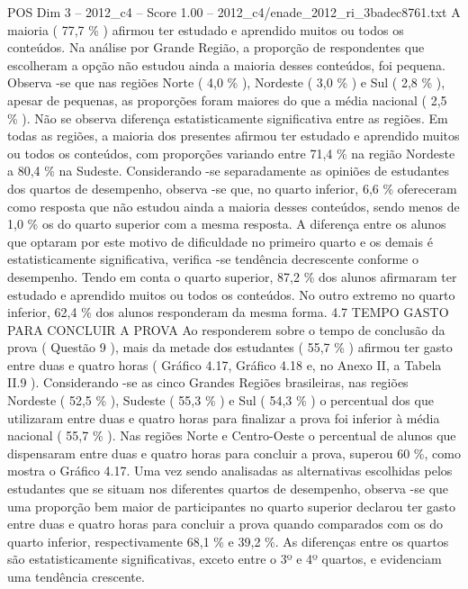 \begin{textsample}{POS Dim 3 – 2012\_c4 – Score 1.00 – 2012\_c4/enade\_2012\_ri\_3badec8761.txt}
A maioria ( 77,7 \% ) afirmou ter estudado e aprendido muitos ou todos os conteúdos.
Na análise por Grande Região, a proporção de respondentes que escolheram a opção não estudou ainda a maioria desses conteúdos, foi pequena.
Observa -se que nas regiões Norte ( 4,0 \% ), Nordeste ( 3,0 \% ) e Sul ( 2,8 \% ), apesar de pequenas, as proporções foram maiores do que a média nacional ( 2,5 \% ).
Não se observa diferença estatisticamente significativa entre as regiões.
Em todas as regiões, a maioria dos presentes afirmou ter estudado e aprendido muitos ou todos os conteúdos, com proporções variando entre 71,4 \% na região Nordeste a 80,4 \% na Sudeste.
Considerando -se separadamente as opiniões de estudantes dos quartos de desempenho, observa -se que, no quarto inferior, 6,6 \% ofereceram como resposta que não estudou ainda a maioria desses conteúdos, sendo menos de 1,0 \% os do quarto superior com a mesma resposta.
A diferença entre os alunos que optaram por este motivo de dificuldade no primeiro quarto e os demais é estatisticamente significativa, verifica -se tendência decrescente conforme o desempenho.
Tendo em conta o quarto superior, 87,2 \% dos alunos afirmaram ter estudado e aprendido muitos ou todos os conteúdos.
No outro extremo no quarto inferior, 62,4 \% dos alunos responderam da mesma forma. 4.7 TEMPO GASTO PARA CONCLUIR A PROVA Ao responderem sobre o tempo de conclusão da prova ( Questão 9 ), mais da metade dos estudantes ( 55,7 \% ) afirmou ter gasto entre duas e quatro horas ( Gráfico 4.17, Gráfico 4.18 e, no Anexo II, a Tabela II.9 ).
Considerando -se as cinco Grandes Regiões brasileiras, nas regiões Nordeste ( 52,5 \% ), Sudeste ( 55,3 \% ) e Sul ( 54,3 \% ) o percentual dos que utilizaram entre duas e quatro horas para finalizar a prova foi inferior à média nacional ( 55,7 \% ).
Nas regiões Norte e Centro-Oeste o percentual de alunos que dispensaram entre duas e quatro horas para concluir a prova, superou 60 \%, como mostra o Gráfico 4.17.
Uma vez sendo analisadas as alternativas escolhidas pelos estudantes que se situam nos diferentes quartos de desempenho, observa -se que uma proporção bem maior de participantes no quarto superior declarou ter gasto entre duas e quatro horas para concluir a prova quando comparados com os do quarto inferior, respectivamente 68,1 \% e 39,2 \%.
As diferenças entre os quartos são estatisticamente significativas, exceto entre o 3º e 4º quartos, e evidenciam uma tendência crescente.

\end{textsample}
